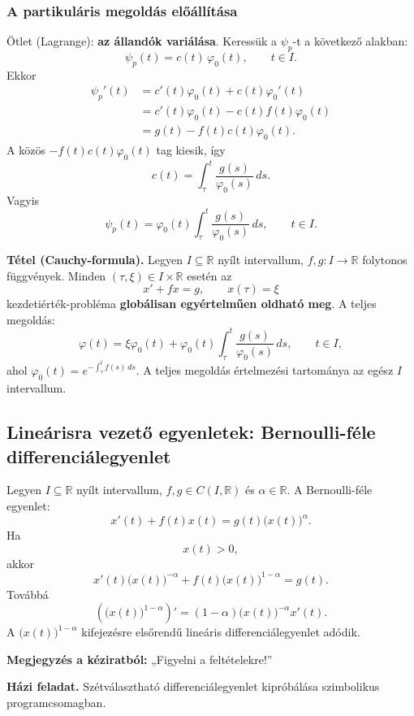 \subsubsection*{A partikuláris megoldás előállítása}
Ötlet (Lagrange): \textbf{az állandók variálása}.
Keressük a $\psi_p$-t a következő alakban:
\[
 \psi_p(t)=c(t)\,\varphi_0(t),\qquad t\in I.
\]
Ekkor
\begin{align*}
 \psi_p'(t)
 &=c'(t)\varphi_0(t)+c(t)\varphi_0'(t)\\
 &=c'(t)\varphi_0(t)-c(t)f(t)\varphi_0(t)\\
 &=g(t)-f(t)c(t)\varphi_0(t).
\end{align*}
A közös $-f(t)c(t)\varphi_0(t)$ tag kiesik, így
\[
 c(t)=\int_\tau^t\frac{g(s)}{\varphi_0(s)}\,ds.
\]
Vagyis
\[
 \boxed{\displaystyle
 \psi_p(t)=\varphi_0(t)\int_\tau^t
    \frac{g(s)}{\varphi_0(s)}\,ds,\qquad t\in I.}
\]

\begin{matbox}
\textbf{Tétel (Cauchy-formula).}
Legyen $I\subseteq\mathbb R$ nyílt intervallum,
$f,g:I\longrightarrow\mathbb R$ folytonos függvények.
Minden $(\tau,\xi)\in I\times\mathbb R$ esetén az
\[
 x'+fx=g,\qquad x(\tau)=\xi
\]
kezdetiérték-probléma \textbf{globálisan egyértelműen oldható meg}.
A teljes megoldás:
\[
 \boxed{\displaystyle
 \varphi(t)=\xi\varphi_0(t)
       +\varphi_0(t)\int_\tau^t\frac{g(s)}{\varphi_0(s)}\,ds,
 \qquad t\in I,}
\]
ahol $\displaystyle\varphi_0(t)=e^{-\int_\tau^t f(s)\,ds}$.
A teljes megoldás értelmezési tartománya az egész $I$ intervallum.
\end{matbox}

\subsection{Lineárisra vezető egyenletek: Bernoulli-féle differenciálegyenlet}
Legyen $I\subseteq\mathbb R$ nyílt intervallum,
$f,g\in C(I,\mathbb R)$ és $\alpha\in\mathbb R$.
A Bernoulli-féle egyenlet:
\[
 x'(t)+f(t)x(t)=g(t)\bigl(x(t)\bigr)^\alpha.
\]
Ha
\[
 \boxed{x(t)>0},
\]
akkor
\[
 x'(t)\bigl(x(t)\bigr)^{-\alpha}
  +f(t)\bigl(x(t)\bigr)^{1-\alpha}
  =g(t).
\]
Továbbá
\[
 \left(\bigl(x(t)\bigr)^{1-\alpha}\right)'
  =(1-\alpha)\bigl(x(t)\bigr)^{-\alpha}x'(t).
\]
A $\bigl(x(t)\bigr)^{1-\alpha}$ kifejezésre
elsőrendű lineáris differenciálegyenlet adódik.

\textbf{Megjegyzés a kéziratból:} „Figyelni a feltételekre!”

\textbf{Házi feladat.}
Szétválasztható differenciálegyenlet kipróbálása szimbolikus
programcsomagban.

